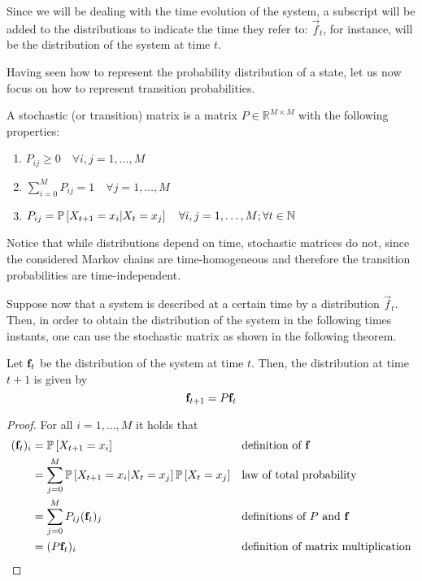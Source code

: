 Since we will be dealing with the time evolution of the system, a subscript will be added to the distributions to indicate the time they refer to: $\vec{f}_t$, for instance, will be the distribution of the system at time $t$.

Having seen how to represent the probability distribution of a state, let us now focus on how to represent transition probabilities.

\begin{ndef}  \label{def:stoc_matrix}
    A stochastic (or transition) matrix is a matrix $P \in \mathbb{R}^{M\times M}$ with the following properties:
    \begin{center}
        \begin{enumerate}
            \item $P_{ij} \geq 0 \quad \forall i,j = 1,\dots,M$
            \item $\sum_{i = 0}^M P_{ij} = 1 \quad \forall j = 1,\dots,M$
            \item $P_{ij} = \mathbb{P}\left[X_{t+1} = x_i | X_t = x_j \right] \quad \forall i,j = 1,\dots,M; \forall t\in \mathbb N$
        \end{enumerate}
    \end{center}
\end{ndef}

Notice that while distributions depend on time, stochastic matrices do not, since the considered Markov chains are time-homogeneous and therefore the transition probabilities are time-independent.

\smallskip
Suppose now that a system is described at a certain time by a distribution $\vec{f}_t$. Then, in order to obtain the distribution of the system in the following times instants, one can use the stochastic matrix as shown in the following theorem.

\begin{theorem} \label{th:evolution_simple}
    Let $\mathbf{f}_t$ be the distribution of the system at time $t$. Then, the distribution at time $t + 1$ is given by
    \begin{equation}
        \mathbf{f}_{t+1} = P \mathbf{f}_t
    \end{equation}
\end{theorem}
\begin{proof}
    For all $i = 1,\dots,M$ it holds that
    \begin{align}
        (\mathbf{f}_t)_i
         & = \mathbb{P}\left[X_{t+1} = x_i \right]                                           &  & \text{definition of $\mathbf{f}$}                                     \\
         & = \sum_{j = 0}^M \mathbb{P}\left[X_{t+1} = x_i | X_t = x_j\right] \mathbb{P}\left[X_t = x_j\right] &  & \text{law of total probability}                \\
         & = \sum_{j = 0}^M P_{ij} (\mathbf{f}_t)_j                                   &  & \text{definitions of $P$ and $\mathbf{f}$} \label{eq:matmul1}          \\
         & = (P \mathbf{f}_t)_i                                                       &  & \text{definition of matrix multiplication} \label{eq:matmul2}
    \end{align}

\end{proof}

